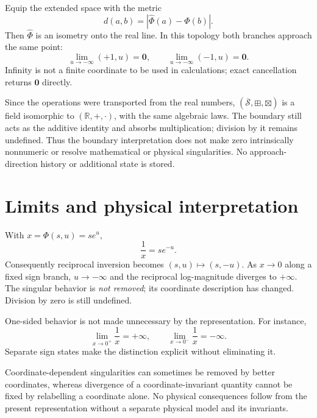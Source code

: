 \documentclass[11pt,a4paper]{article}
\newcommand{\R}{\mathbb{R}}
\begin{document}
Equip the extended space with the metric
\begin{equation}
 d(a,b)=|\widehat\Phi(a)-\widehat\Phi(b)|.
\end{equation}
Then $\widehat\Phi$ is an isometry onto the real line.
In this topology both branches approach the same point:
\begin{equation}
 \lim_{u\to-\infty}(+1,u)=\mathbf{0},\qquad
 \lim_{u\to-\infty}(-1,u)=\mathbf{0}.
\end{equation}
Infinity is not a finite coordinate to be used in calculations;
exact cancellation returns $\mathbf{0}$ directly.

Since the operations were transported from the real numbers,
$(\overline{\mathcal S},\boxplus,\boxtimes)$ is a field
isomorphic to $(\R,+,\cdot)$, with the same algebraic laws.
The boundary still acts as the additive identity and absorbs
multiplication; division by it remains undefined. Thus the
boundary interpretation does not make zero intrinsically
nonnumeric or resolve mathematical or physical singularities.
No approach-direction history or additional state is stored.

\section{Limits and physical interpretation}

With $x=\Phi(s,u)=s e^u$,
\begin{equation}
 \frac{1}{x}=s e^{-u}.
\end{equation}
Consequently reciprocal inversion becomes $(s,u)\mapsto(s,-u)$.
As $x\to0$ along a fixed sign branch, $u\to-\infty$ and the
reciprocal log-magnitude diverges to $+\infty$. The singular behavior
is \emph{not removed}; its coordinate description has changed.
Division by zero is still undefined.

One-sided behavior is not made unnecessary by the representation.
For instance,
\begin{equation}
 \lim_{x\to0^+}\frac1x=+\infty,\qquad
 \lim_{x\to0^-}\frac1x=-\infty.
\end{equation}
Separate sign states make the distinction explicit without
eliminating it.

Coordinate-dependent singularities can sometimes be removed by
better coordinates, whereas divergence of a coordinate-invariant
quantity cannot be fixed by relabelling a coordinate alone. No
physical consequences follow from the present representation without
a separate physical model and its invariants.
\end{document}
